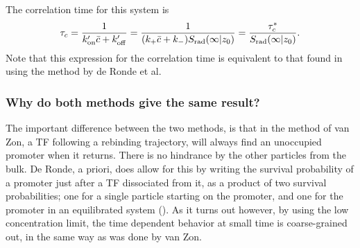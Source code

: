 The correlation time for this system is
\begin{equation}
 \tau_c = \frac{1}{k'_{\rm on} \bar{c} + k'_{\rm off}} = \frac{1}{ (k_+ \bar{c} + k_- ) S_{\rm rad}(\infty|z_0) } = \frac{\tau_c^*}{S_{\rm rad}(\infty|z_0)}.
\end{equation}
Note that this expression for the correlation time is equivalent to that found in  using the method by de Ronde et al. 

\subsubsection{Why do both methods give the same result?}
The important difference between the two methods, is that in the method of van Zon, a TF following a rebinding trajectory, will always find an unoccupied promoter when it returns. There is no hindrance by the other particles from the bulk. De Ronde, a priori, does allow for this by writing the survival probability of a promoter just after a TF dissociated from it, as a product of two survival probabilities; one for a single particle starting on the promoter, and one for the promoter in an equilibrated system (). As it turns out however, by using the low concentration limit, the time dependent behavior at small time is coarse-grained out, in the same way as was done by van Zon.

